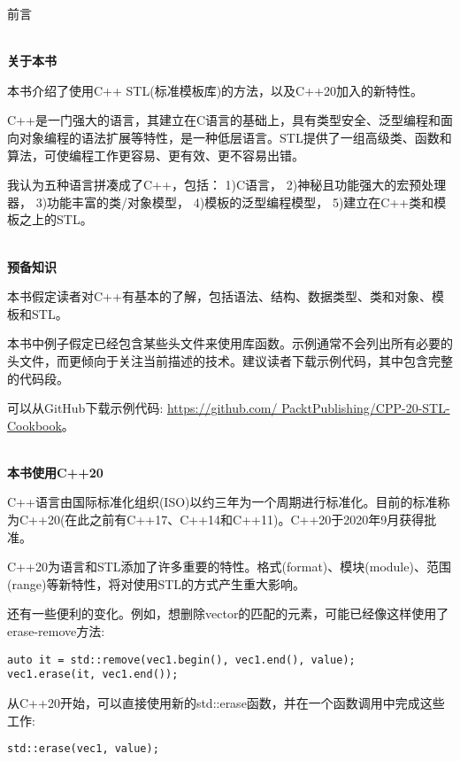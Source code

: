 \begin{flushright}
	 前言
\end{flushright}

\hspace*{\fill} \\ %
\noindent
\textbf{关于本书}

本书介绍了使用C++ STL(标准模板库)的方法，以及C++20加入的新特性。

C++是一门强大的语言，其建立在C语言的基础上，具有类型安全、泛型编程和面向对象编程的语法扩展等特性，是一种低层语言。STL提供了一组高级类、函数和算法，可使编程工作更容易、更有效、更不容易出错。

我认为五种语言拼凑成了C++，包括：
1)C语言，
2)神秘且功能强大的宏预处理器，
3)功能丰富的类/对象模型，
4)模板的泛型编程模型，
5)建立在C++类和模板之上的STL。

\hspace*{\fill} \\ %
\noindent
\textbf{预备知识}

本书假定读者对C++有基本的了解，包括语法、结构、数据类型、类和对象、模板和STL。

本书中例子假定已经包含某些头文件来使用库函数。示例通常不会列出所有必要的头文件，而更倾向于关注当前描述的技术。建议读者下载示例代码，其中包含完整的代码段。

可以从GitHub下载示例代码: \url{https://github.com/ PacktPublishing/CPP-20-STL-Cookbook}。

\hspace*{\fill} \\ %
\noindent
\textbf{本书使用C++20}

C++语言由国际标准化组织(ISO)以约三年为一个周期进行标准化。目前的标准称为C++20(在此之前有C++17、C++14和C++11)。C++20于2020年9月获得批准。

C++20为语言和STL添加了许多重要的特性。格式(format)、模块(module)、范围(range)等新特性，将对使用STL的方式产生重大影响。

还有一些便利的变化。例如，想删除vector的匹配的元素，可能已经像这样使用了erase-remove方法:

\begin{lstlisting}[style=styleCXX]
auto it = std::remove(vec1.begin(), vec1.end(), value);
vec1.erase(it, vec1.end());
\end{lstlisting}

从C++20开始，可以直接使用新的std::erase函数，并在一个函数调用中完成这些工作:

\begin{lstlisting}[style=styleCXX]
std::erase(vec1, value);
\end{lstlisting}

